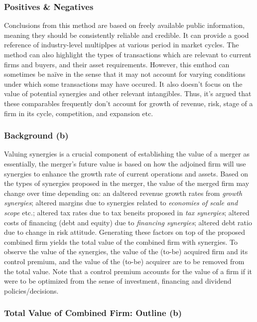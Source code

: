 \documentclass[11pt, english]{article}
\begin{document}
                \subsubsection*{Positives \& Negatives}

        Conclusions from this method are based on freely available public information, meaning they should be consistently reliable and credible. It can provide a good reference of industry-level multiplpes at various period in market cycles. The method can also highlight the types of transactions which are relevant to current firms and buyers, and their asset requirements. However, this emthod can sometimes be na\"{i}ve in the sense that it may not account for varying conditions under which some transactions may have occured. It also doesn't focus on the value of potential synergies and other relevant intangibles. Thus, it's argued that these comparables frequently don't account for growth of revenue, risk, stage of a firm in its cycle, competition, and expansion etc.

		\subsubsection*{Background (b)}

        Valuing synergies is a crucial component of establishing the value of a merger as essentially, the merger's future value is based on how the adjoined firm will use synergies to enhance the growth rate of current operations and assets. Based on the types of synergies proposed in the merger, the value of the merged firm may change over time depending on: an daltered revenue growth rates from \textit{growth synergies}; altered margins due to synergies related to \textit{economies of scale and scope} etc.; altered tax rates due to tax beneits proposed in \textit{tax synergies}; altered costs of financing (debt and equity) due to \textit{financing synergies}; altered debt ratio due to change in risk attitude. Generating these factors on top of the proposed combined firm yields the total value of the combined firm with synergies. To observe the value of the synergies, the value of the (to-be) acquired firm and its control premium, and the value of the (to-be) acquirer are to be removed from the total value. Note that a control premium accounts for the value of a firm if it were to be optimized from the sense of investment, financing and dividend policies/decisions.

                \subsubsection*{Total Value of Combined Firm: Outline (b)}
\end{document}
